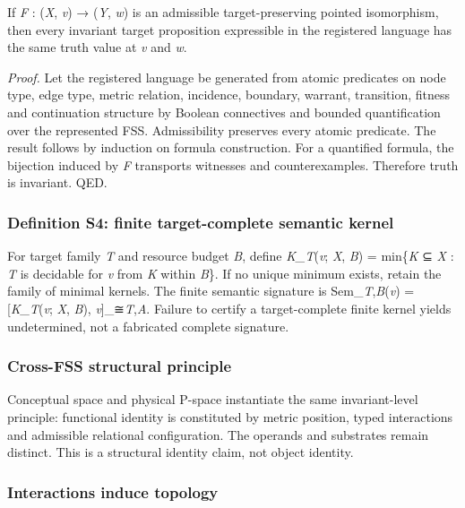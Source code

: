 If \emph{F} : (\emph{X}, \emph{v}) → (\emph{Y}, \emph{w}) is an
admissible target-preserving pointed isomorphism, then every invariant
target proposition expressible in the registered language has the same
truth value at \emph{v} and \emph{w}.

\emph{Proof.} Let the registered language be generated from atomic
predicates on node type, edge type, metric relation, incidence,
boundary, warrant, transition, fitness and continuation structure by
Boolean connectives and bounded quantification over the represented FSS.
Admissibility preserves every atomic predicate. The result follows by
induction on formula construction. For a quantified formula, the
bijection induced by \emph{F} transports witnesses and counterexamples.
Therefore truth is invariant. QED.

\hypertarget{definition-s4-finite-target-complete-semantic-kernel}{%
\subsubsection{Definition S4: finite target-complete semantic
kernel}\label{definition-s4-finite-target-complete-semantic-kernel}}

For target family \emph{T} and resource budget \emph{B}, define
\emph{K\_T}(\emph{v}; \emph{X}, \emph{B}) = min\{\emph{K} ⊆ \emph{X} :
\emph{T} is decidable for \emph{v} from \emph{K} within \emph{B}\}. If
no unique minimum exists, retain the family of minimal kernels. The
finite semantic signature is Sem\_\emph{T},\emph{B}(\emph{v}) =
{[}\emph{K\_T}(\emph{v}; \emph{X}, \emph{B}),
\emph{v}{]}\_≅\emph{T},\emph{A}. Failure to certify a target-complete
finite kernel yields undetermined, not a fabricated complete signature.

\hypertarget{cross-fss-structural-principle}{%
\subsubsection{Cross-FSS structural
principle}\label{cross-fss-structural-principle}}

Conceptual space and physical P-space instantiate the same
invariant-level principle: functional identity is constituted by metric
position, typed interactions and admissible relational configuration.
The operands and substrates remain distinct. This is a structural
identity claim, not object identity.

\hypertarget{interactions-induce-topology}{%
\subsubsection{Interactions induce
topology}\label{interactions-induce-topology}}

